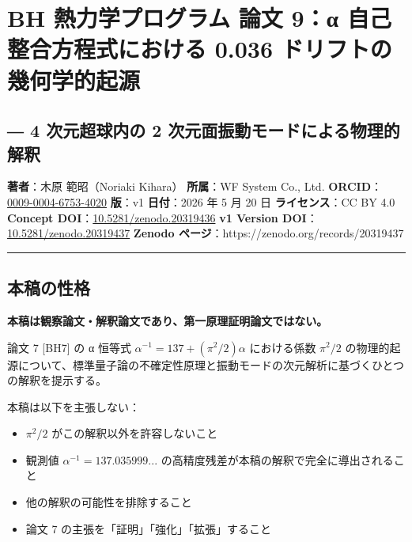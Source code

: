\documentclass[
  11pt]{ltjsarticle}
\author{}
\date{}
\providecommand{\tightlist}{%
  \setlength{\itemsep}{0pt}\setlength{\parskip}{0pt}}
\begin{document}
\section{BH 熱力学プログラム 論文 9：α 自己整合方程式における 0.036
ドリフトの幾何学的起源}\label{bh-ux71b1ux529bux5b66ux30d7ux30edux30b0ux30e9ux30e0-ux8ad6ux6587-9ux3b1-ux81eaux5df1ux6574ux5408ux65b9ux7a0bux5f0fux306bux304aux3051ux308b-0.036-ux30c9ux30eaux30d5ux30c8ux306eux5e7eux4f55ux5b66ux7684ux8d77ux6e90}

\subsection{― 4 次元超球内の 2
次元面振動モードによる物理的解釈}\label{ux6b21ux5143ux8d85ux7403ux5185ux306e-2-ux6b21ux5143ux9762ux632fux52d5ux30e2ux30fcux30c9ux306bux3088ux308bux7269ux7406ux7684ux89e3ux91c8}

\textbf{著者}：木原 範昭（Noriaki Kihara） \textbf{所属}：WF System Co.,
Ltd.
\textbf{ORCID}：\href{https://orcid.org/0009-0004-6753-4020}{0009-0004-6753-4020}
\textbf{版}：v1 \textbf{日付}：2026 年 5 月 20 日
\textbf{ライセンス}：CC BY 4.0 \textbf{Concept
DOI}：\href{https://doi.org/10.5281/zenodo.20319436}{10.5281/zenodo.20319436}
\textbf{v1 Version
DOI}：\href{https://doi.org/10.5281/zenodo.20319437}{10.5281/zenodo.20319437}
\textbf{Zenodo ページ}：https://zenodo.org/records/20319437

\begin{center}\rule{0.5\linewidth}{0.5pt}\end{center}

\subsection{本稿の性格}\label{ux672cux7a3fux306eux6027ux683c}

\textbf{本稿は観察論文・解釈論文であり、第一原理証明論文ではない。}

論文 7 {[}BH7{]} の α 恒等式 \(\alpha^{-1} = 137 + (\pi^2/2)\alpha\)
における係数 \(\pi^2/2\)
の物理的起源について、標準量子論の不確定性原理と振動モードの次元解析に基づくひとつの解釈を提示する。

本稿は以下を主張しない：

\begin{itemize}
\tightlist
\item
  \(\pi^2/2\) がこの解釈以外を許容しないこと
\item
  観測値 \(\alpha^{-1} = 137.035999...\)
  の高精度残差が本稿の解釈で完全に導出されること
\item
  他の解釈の可能性を排除すること
\item
  論文 7 の主張を「証明」「強化」「拡張」すること
\end{itemize}
\end{document}
